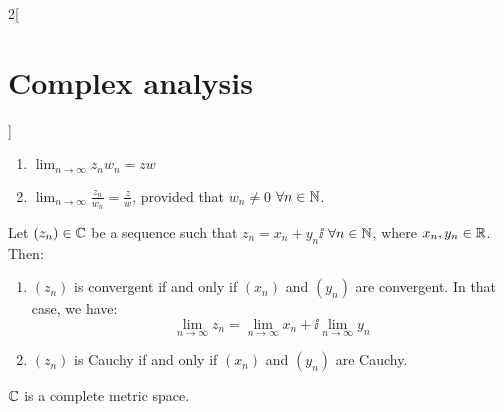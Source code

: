 \documentclass[../../../main.tex]{subfiles}
\begin{document}
\begin{multicols}{2}[\section{Complex analysis}]
\begin{proposition}
\begin{enumerate}
      \item $\displaystyle\lim_{n\to\infty}z_nw_n=zw$
      \item $\displaystyle\lim_{n\to\infty}\frac{z_n}{w_n}=\frac{z}{w}$, provided that $w_n\ne 0$ $\forall n\in\mathbb{N}$.
    \end{enumerate}
  \end{proposition}
  \begin{definition}
    Let $(z_n)\in\mathbb{C}$ be a sequence such that $z_n=x_n+y_n\ii$ $\forall n\in\mathbb{N}$, where $x_n,y_n\in\mathbb{R}$. Then:
    \begin{enumerate}
      \item $(z_n)$ is convergent if and only if $(x_n)$ and $(y_n)$ are convergent. In that case, we have: $$\lim_{n\to\infty}z_n=\lim_{n\to\infty}x_n+\ii\lim_{n\to\infty}y_n$$
      \item $(z_n)$ is Cauchy if and only if $(x_n)$ and $(y_n)$ are Cauchy.
    \end{enumerate}
  \end{definition}
  \begin{theorem}
    $\mathbb{C}$ is a complete metric space.
  \end{theorem}

\end{multicols}
\end{document}
